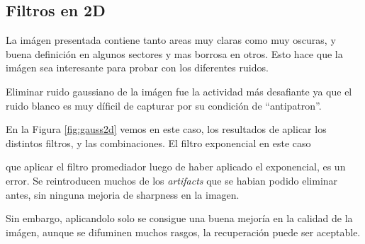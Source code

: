 \subsection{Filtros en 2D}

La im\'agen presentada contiene tanto areas muy claras como muy oscuras, y buena definici\'on
en algunos sectores y mas borrosa en otros. Esto hace que la im\'agen sea interesante para probar
con los diferentes ruidos.

Eliminar ruido gaussiano de la im\'agen fue la actividad m\'as desafiante
ya que el ruido blanco es muy d\'ificil de capturar por su condici\'on de ``antipatron''.

En la Figura \ref{fig:gauss2d} vemos en este caso, los resultados de aplicar los 
distintos filtros, y las combinaciones. El filtro exponencial en este caso

que aplicar el filtro
promediador luego de haber aplicado el exponencial, es un error. 
Se reintroducen muchos de los \textit{artifacts} que se habian podido
eliminar antes, sin ninguna mejoria de sharpness en la imagen. 

Sin embargo, aplicandolo solo se consigue una buena mejor\'ia en la calidad
de la im\'agen, aunque se difuminen muchos rasgos, la recuperaci\'on puede ser aceptable.
